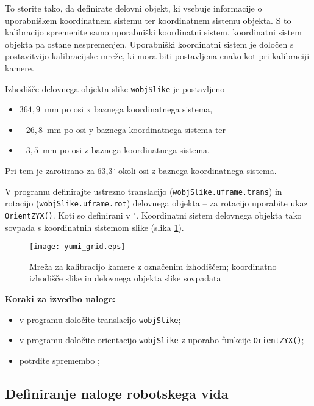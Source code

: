 To storite tako, da definirate delovni objekt, ki vsebuje informacije o uporabniškem koordinatnem sistemu ter koordinatnem sistemu objekta. S to kalibracijo spremenite samo uporabniški koordinatni sistem, koordinatni sistem objekta pa ostane nespremenjen. Uporabniški koordinatni sistem je določen s postavitvijo kalibracijske mreže, ki mora biti postavljena enako kot pri kalibraciji kamere.

Izhodišče delovnega objekta slike \verb"wobjSlike" je postavljeno
\begin{itemize}
  \item $364,9$~mm po osi x baznega koordinatnega sistema,
  \item $-26,8$~mm po osi y baznega koordinatnega sistema ter
  \item $-3,5$~mm po osi z baznega koordinatnega sistema.
\end{itemize}
Pri tem je zarotirano za 63,3${}^\circ$ okoli osi z baznega koordinatnega sistema.

V programu definirajte ustrezno translacijo (\verb"wobjSlike.uframe.trans") in rotacijo (\verb"wobjSlike.uframe.rot") delovnega objekta -- za rotacijo uporabite ukaz \verb"OrientZYX()". Koti so definirani v ${}^\circ$. Koordinatni sistem delovnega objekta tako sovpada s koordinatnih sistemom slike (slika \ref{fig:yumi_grid}).


\begin{figure}[!t]
\centering
\texttt{[image: yumi\_grid.eps]}
\caption{Mreža za kalibracijo kamere z označenim izhodiščem; koordinatno izhodišče slike in delovnega objekta slike sovpadata}
\label{fig:yumi_grid}
\end{figure}

\vspace{5mm}
\begin{mdframed}[backgroundcolor=yellow!20, shadow=true,roundcorner=8pt]
\textbf{Koraki za izvedbo naloge:}
\begin{itemize}
          \item v programu določite translacijo \verb"wobjSlike";
          \item v programu določite orientacijo \verb"wobjSlike" z uporabo funkcije \verb"OrientZYX()";
          \item potrdite spremembo ;
\end{itemize}
\end{mdframed}

\subsection{Definiranje naloge robotskega vida}
\label{ch:vision_job}


